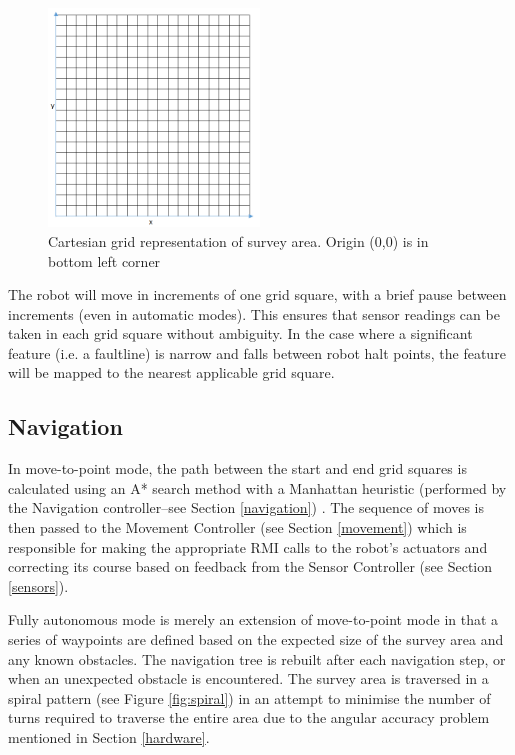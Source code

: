 \documentclass[12pt]{article}
\begin{document}
\begin{figure}[!htb]
\centering\includegraphics[width=0.5\textwidth]{grid1.png}
\caption{Cartesian grid representation of survey area. Origin (0,0) is in bottom left corner}
  \label{fig:grid}
\end{figure}

The robot will move in increments of one grid square, with a brief pause between increments (even in automatic modes). This ensures that sensor readings can be taken in each grid square without ambiguity. In the case where a significant feature (i.e. a faultline) is narrow and falls between robot halt points, the feature will be mapped to the nearest applicable grid square.

\subsection{Navigation}\label{navoverview}
In move-to-point mode, the path between the start and end grid squares is calculated using an A* search method with a Manhattan heuristic (performed by the Navigation controller--see Section \ref{navigation}) \cite{jones}. The sequence of moves is then passed to the Movement Controller (see Section \ref{movement}) which is responsible for making the appropriate RMI calls to the robot's actuators and correcting its course based on feedback from the Sensor Controller (see Section \ref{sensors}).

Fully autonomous mode is merely an extension of move-to-point mode in that a series of waypoints are defined based on the expected size of the survey area and any known obstacles. The navigation tree is rebuilt after each navigation step, or when an unexpected obstacle is encountered. The survey area is traversed in a spiral pattern (see Figure \ref{fig:spiral}) in an attempt to minimise the number of turns required to traverse the entire area due to the angular accuracy problem mentioned in Section \ref{hardware}.
\end{document}
